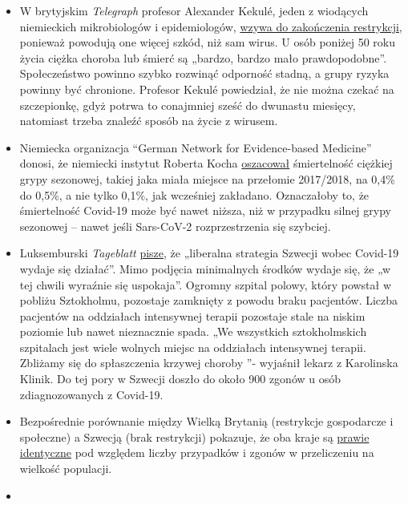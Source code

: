 \begin{itemize}
\tightlist
\item
  W brytyjskim \emph{Telegraph} profesor Alexander Kekulé, jeden z
  wiodących niemieckich mikrobiologów i epidemiologów,
  \href{https://www.telegraph.co.uk/news/2020/04/11/german-scientist-predicted-european-epidemic-calls-end-lockdown/}{wzywa
  do zakończenia restrykcji}, ponieważ powodują one więcej szkód, niż
  sam wirus. U osób poniżej 50 roku życia ciężka choroba lub śmierć są
  „bardzo, bardzo mało prawdopodobne''. Społeczeństwo powinno szybko
  rozwinąć odporność stadną, a grupy ryzyka powinny być chronione.
  Profesor Kekulé powiedział, że nie można czekać na szczepionkę, gdyż
  potrwa to conajmniej sześć do dwunastu miesięcy, natomiast trzeba
  znaleźć sposób na życie z wirusem.
\item
  Niemiecka organizacja ``German Network for Evidence-based Medicine''
  donosi, że niemiecki instytut Roberta Kocha
  \href{https://www.ebm-netzwerk.de/en/publications/covid-19}{oszacował}
  śmiertelność ciężkiej grypy sezonowej, takiej jaka miała miejsce na
  przełomie 2017/2018, na 0,4\% do 0,5\%, a nie tylko 0,1\%, jak
  wcześniej zakładano. Oznaczałoby to, że śmiertelność Covid-19 może być
  nawet niższa, niż w przypadku silnej grypy sezonowej -- nawet jeśli
  Sars-CoV-2 rozprzestrzenia się szybciej.
\item
  Luksemburski \emph{Tageblatt}
  \href{https://swprs.files.wordpress.com/2020/04/volksblatt_schweden_corona_20200414_18.pdf}{pisze},
  że „liberalna strategia Szwecji wobec Covid-19 wydaje się działać''.
  Mimo podjęcia minimalnych środków wydaje się, że „w tej chwili
  wyraźnie się uspokaja''. Ogromny szpital polowy, który powstał w
  pobliżu Sztokholmu, pozostaje zamknięty z powodu braku pacjentów.
  Liczba pacjentów na oddziałach intensywnej terapii pozostaje stale na
  niskim poziomie lub nawet nieznacznie spada. „We wszystkich
  sztokholmskich szpitalach jest wiele wolnych miejsc na oddziałach
  intensywnej terapii. Zbliżamy się do spłaszczenia krzywej choroby ''-
  wyjaśnił lekarz z Karolinska Klinik. Do tej pory w Szwecji doszło do
  około 900 zgonów u osób zdiagnozowanych z Covid-19.
\item
  Bezpośrednie porównanie między Wielką Brytanią (restrykcje gospodarcze
  i społeczne) a Szwecją (brak restrykcji) pokazuje, że oba kraje są
  \href{http://www.theblogmire.com/a-comparison-of-lockdown-uk-with-non-lockdown-sweden/}{prawie
  identyczne} pod względem liczby przypadków i zgonów w przeliczeniu na
  wielkość populacji.
\item

\end{itemize}

